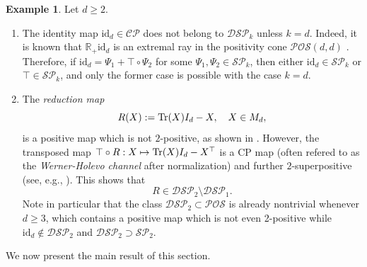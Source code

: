 \documentclass[11pt,reqno]{amsart}
\theoremstyle{definition}
\theoremstyle{definition}
\theoremstyle{definition}
\newtheorem{example}[theorem]{Example}
\theoremstyle{definition}
\newcommand{\Real}{\mathbb{R}}
\newcommand{\id}{\mathrm{id}}
\newcommand{\PO}{\mathcal{POS}}
\newcommand{\CP}{\mathcal{CP}}
\newcommand{\SP}{\mathcal{SP}}
\newcommand{\DSP}{\mathcal{DSP}}
\begin{document}
\begin{example} \label{ex:DSPex}
Let $d\geq 2$.
\begin{enumerate}
    \item The identity map $\id_d\in \CP$ does not belong to $\DSP_k$ unless $k=d$. Indeed, it is known that $\Real_+\id_d$ is an extremal ray in the positivity cone $\PO(d,d)$ \cite{YH05}. Therefore, if $\id_d=\Psi_1 +  \top \circ \Psi_2$ for some $\Psi_1,\Psi_2\in \SP_k$, then either $\id_d\in \SP_k$ or $\top\in \SP_k$, and only the former case is possible with the case $k=d$.

    \item The \emph{reduction map} \cite{HH99}
        $$R(X):=\Tr(X)I_d - X, \quad X\in M_d,$$
    is a positive map which is not $2$-positive, as shown in \cite{Tom85}. However, the transposed map $\top \circ R:X\mapsto \Tr(X)I_d-X^{\top}$ is a CP map (often refered to as the \emph{Werner-Holevo channel} \cite{WH02} after normalization) and further $2$-superpositive (see, e.g., \cite{Kye23lect,PY24}). This shows that
        $$R\in \DSP_2\setminus \DSP_1.$$
    Note in particular that the class $\DSP_2\subset \PO$ is already nontrivial whenever $d\geq 3$, which contains a positive map which is not even 2-positive while $\id_d\notin \DSP_2$ and $\DSP_2\supset \SP_2$.  
\end{enumerate}
\end{example}

We now present the main result of this section.
\end{document}
